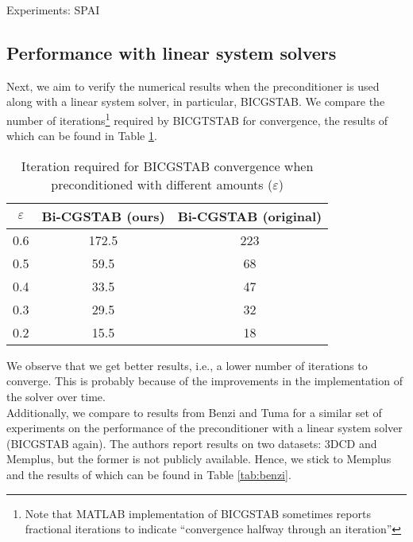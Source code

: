 \documentclass[paper=A4, fontsize=11pt]{scrartcl}
\theoremstyle{remark}
\begin{document}
\begin{section}{Experiments: SPAI}
\subsection{Performance with linear system solvers}
Next, we aim to verify the numerical results when the preconditioner is used along with a linear system solver, in particular, BICGSTAB. We compare the number of iterations\footnote{Note that MATLAB implementation of BICGSTAB sometimes reports fractional iterations to indicate ``convergence halfway through an iteration''} required by BICGTSTAB for convergence, the results of which can be found in Table \ref{tab:grote1}. 
\begin{table}[h]
	\centering
	\begin{tabular}{@{}ccc@{}}
		\toprule
		$\varepsilon$ & Bi-CGSTAB (ours) & Bi-CGSTAB (original)\\
		\midrule
		0.6    &   172.5       & 223\\     
		0.5    &   59.5        & 68\\    
		0.4    &   33.5        &47 \\    
		0.3    &   29.5        & 32 \\    
		0.2    &   15.5 & 18 \\
		\bottomrule
	\end{tabular}
	\caption{Iteration required for BICGSTAB convergence when preconditioned with different amounts ($\varepsilon$)}
	\label{tab:grote1}
\end{table}

We observe that we get better results, i.e., a lower number of iterations to converge. This is probably because of the improvements in the implementation of the solver over time. \\

Additionally, we compare to results from Benzi and Tuma \cite{benzi} for a similar set of experiments on the performance of the preconditioner with a linear system solver (BICGSTAB again). The authors \cite{benzi} report results on two datasets: 3DCD and Memplus, but the former is not publicly available. Hence, we stick to Memplus and the results of which can be found in Table \ref{tab:benzi}.


\end{section}
\end{document}

